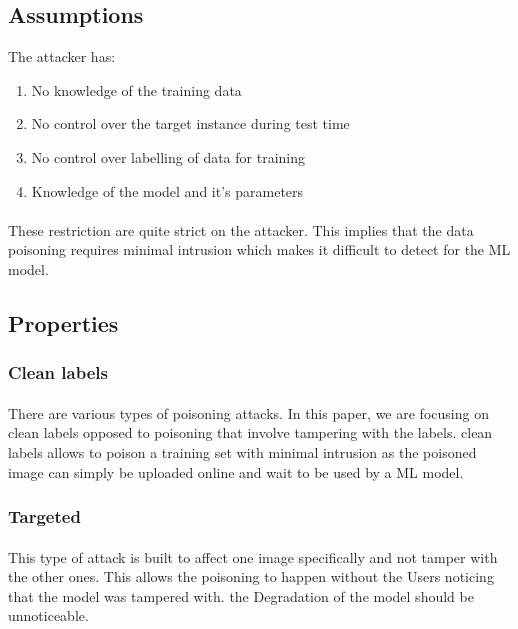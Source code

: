 \documentclass{article}
\begin{document}
\subsection{Assumptions}

The attacker has:
\begin{enumerate}
  \item No knowledge of the training data
  \item No control over the target instance during test time
  \item No control over labelling of data for training
  \item Knowledge of the model and it's parameters
\end{enumerate}
\paragraph{}
These restriction are quite strict on the attacker. This implies that the data poisoning requires minimal intrusion which makes it difficult to detect for the ML model.
\subsection{Properties}

\subsubsection*{Clean labels}
\paragraph{}
There are various types of poisoning attacks. In this paper, we are focusing on clean labels opposed to poisoning that involve tampering with the labels. clean labels allows to poison a training set with minimal intrusion as the poisoned image can simply be uploaded online and wait to be used by a ML model.

\subsubsection*{Targeted}
\paragraph{}
This type of attack is built to affect one image specifically and not tamper with the other ones. This allows the poisoning to happen without the Users noticing that the model was tampered with. the Degradation of the model should be unnoticeable.
\end{document}

